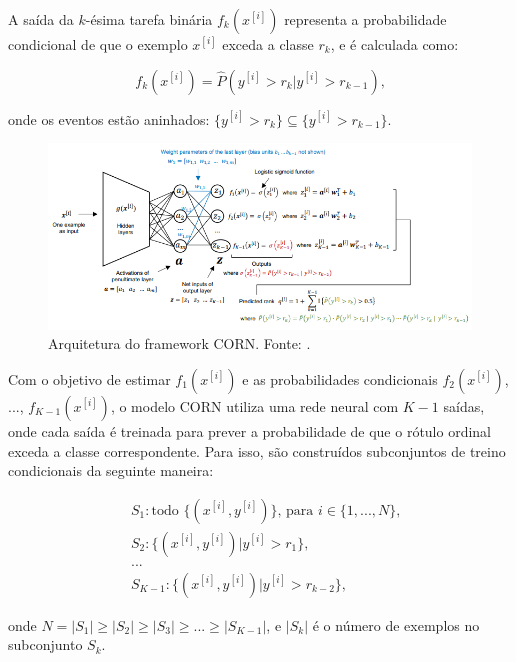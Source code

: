 A saída da $k$-ésima tarefa binária $f_k (x^{[i]})$ representa a probabilidade condicional de que o exemplo $x^{[i]}$ exceda a classe $r_k$, e é calculada como:

\begin{equation}
    f_k (x^{[i]}) = \hat{P} (y^{[i]} > r_k | y^{[i]} > r_{k-1}) \text{,}
\end{equation}

onde os eventos estão aninhados: $\lbrace y^{[i]} > r_k \rbrace \subseteq \lbrace y^{[i]} > r_{k-1} \rbrace$.

\begin{figure}[!htbp]
    \centering
    \includegraphics[width=\linewidth]{figs/corn-nn.png}
    \caption{Arquitetura do framework CORN. Fonte: .}
    \label{fig:corn-nn}
\end{figure}

Com o objetivo de estimar $f_1 (x^{[i]})$ e as probabilidades condicionais $f_2 (x^{[i]})$, ..., $f_{K-1} (x^{[i]})$, o modelo CORN utiliza uma rede neural com $K-1$ saídas, onde cada saída é treinada para prever a probabilidade de que o rótulo ordinal exceda a classe correspondente. Para isso, são construídos subconjuntos de treino condicionais da seguinte maneira:

\begin{equation}
    \begin{split}
        &S_1: \text{todo } \lbrace (x^{[i]}, y^{[i]}) \rbrace \text{, para } i \in \lbrace 1,...,N \rbrace \text{,}\\
        &S_2: \lbrace (x^{[i]}, y^{[i]}) | y^{[i]} > r_1 \rbrace \text{,}\\
        &...\\
        &S_{K-1}: \lbrace (x^{[i]}, y^{[i]}) | y^{[i]} > r_{k-2} \rbrace \text{,}
    \end{split}
\end{equation}

onde $N = |S_1| \ge |S_2| \geq |S_3| \geq ... \geq |S_{K-1}|$, e $|S_k|$ é o número de exemplos no subconjunto $S_k$.

